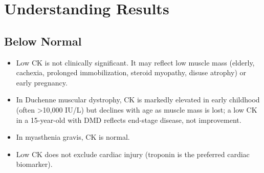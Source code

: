 \section*{Understanding Results}

\subsection*{Below Normal}
\begin{itemize}
  \item Low CK is not clinically significant. It may reflect low muscle mass (elderly, cachexia, prolonged immobilization, steroid myopathy, disuse atrophy) or early pregnancy.
  \item In Duchenne muscular dystrophy, CK is markedly elevated in early childhood (often >10,000 IU/L) but declines with age as muscle mass is lost; a low CK in a 15-year-old with DMD reflects end-stage disease, not improvement.
  \item In myasthenia gravis, CK is normal.
  \item Low CK does not exclude cardiac injury (troponin is the preferred cardiac biomarker).
\end{itemize}

